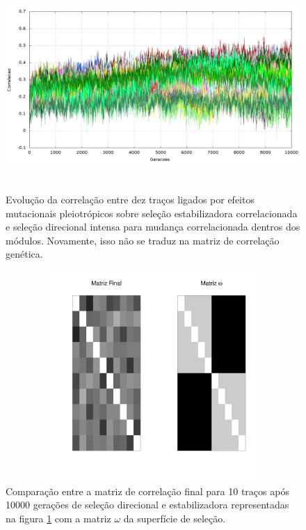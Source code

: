 \begin{center}
\begin{figure}[htbp]
  \includegraphics[width=150mm, height=80mm]{figuras/jones10tracosDirecional.png}
  \caption{Evolução da correlação entre dez traços ligados por efeitos
  mutacionais pleiotrópicos sobre seleção estabilizadora correlacionada
  e seleção direcional intensa para mudança correlacionada dentros dos
  módulos. Novamente, isso não se traduz na matriz de correlação genética.}
  \label{jones10tracosDirecional}
\end{figure}
\end{center}

\begin{center}
\begin{figure}[htbp]
  \includegraphics[width=150mm, height=80mm]{figuras/Mat10tracosDirecional}
   \caption{Comparação entre a matriz de correlação final para 10
   traços após 10000
   gerações de seleção direcional e estabilizadora representadas na figura \ref{jones10tracosDirecional} com a matriz $\omega$ da superfície de seleção.}
  \label{MatJones10tracosDirecional}
\end{figure}
\end{center}

